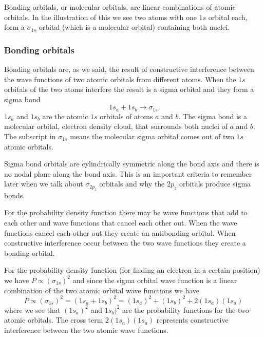 \documentclass[../mit-general-chemistry.tex]{subfiles}
\begin{document}
Bonding orbitals, or molecular orbitals, are linear combinations of
atomic orbitals. In the illustration of this we see two atoms with one
$1s$ orbital each, form a $\sigma_{1s}$ orbital (which is a molecular
orbital) containing both nuclei.




\subsubsection{Bonding orbitals}


Bonding orbitals are, as we said, the result of constructive
interference between the wave functions of two atomic orbitals from
different atoms. When the $1s$ orbitals of the two atoms interfere the
result is a sigma orbital and they form a sigma bond
\begin{equation*}
  1s_a + 1s_b \longrightarrow \sigma_{1s}
\end{equation*}
$1s_a$ and $1s_b$ are the atomic $1s$ orbitals of atoms $a$ and
$b$. The sigma bond is a molecular orbital, electron density cloud,
that surrounds both nuclei of $a$ and $b$. The subscript in
$\sigma_{1s}$ means the molecular sigma orbital comes out of two $1s$
atomic orbitals.

Sigma bond orbitals are cylindrically symmetric along the bond axis
and there is no nodal plane along the bond axis. This is an important
criteria to remember later when we talk about $\sigma_{2p_z}$
orbitals and why the $2p_z$ orbitals produce sigma bonds.

For the probability density function there may be wave functions that
add to each other and wave functions that cancel each other out. When
the wave functions cancel each other out they create an antibonding
orbital. When constructive interference occur between the two wave
functions they create a bonding orbital.


For the probability density function (for finding an electron in a
certain position) we have $P \propto (\sigma_{1s})^2$ and since the
sigma orbital wave function is a linear combination of the two atomic
orbital wave functions we have
\begin{equation*}
  P \propto (\sigma_{1s})^2 = (1s_a + 1s_b)^2 = (1s_a)^2 + (1s_b)^2 + 2(1s_a)(1s_a)
\end{equation*}
where we see that $(1s_a)^2$ and $1s_b)^2$ are the probability
functions for the two atomic orbitals. The cross term $2(1s_a)(1s_a)$
represents constructive interference between the two atomic wave
functions.
\end{document}
